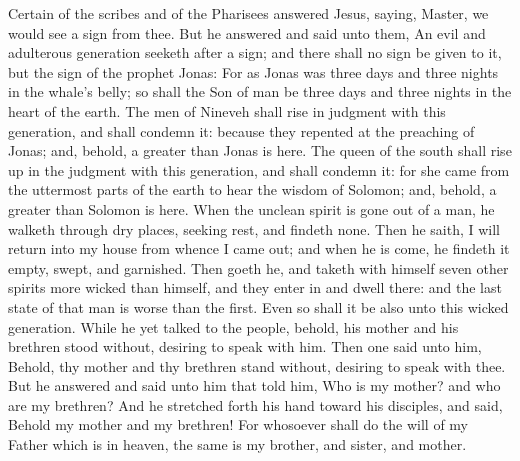 
\vspace{-0.25\baselineskip}

 Certain of the scribes and of the Pharisees answered Jesus, saying, Master, we would see a sign from thee. But he answered and said unto them, An evil and adulterous generation seeketh after a sign; and there shall no sign be given to it, but the sign of the prophet Jonas: For as Jonas was three days and three nights in the whale's belly; so shall the Son of man be three days and three nights in the heart of the earth. The men of Nineveh shall rise in judgment with this generation, and shall condemn it: because they repented at the preaching of Jonas; and, behold, a greater than Jonas is here. The queen of the south shall rise up in the judgment with this generation, and shall condemn it: for she came from the uttermost parts of the earth to hear the wisdom of Solomon; and, behold, a greater than Solomon is here. When the unclean spirit is gone out of a man, he walketh through dry places, seeking rest, and findeth none. Then he saith, I will return into my house from whence I came out; and when he is come, he findeth it empty, swept, and garnished. Then goeth he, and taketh with himself seven other spirits more wicked than himself, and they enter in and dwell there: and the last state of that man is worse than the first. Even so shall it be also unto this wicked generation. While he yet talked to the people, behold, his mother and his brethren stood without, desiring to speak with him. Then one said unto him, Behold, thy mother and thy brethren stand without, desiring to speak with thee. But he answered and said unto him that told him, Who is my mother? and who are my brethren? And he stretched forth his hand toward his disciples, and said, Behold my mother and my brethren! For whosoever shall do the will of my Father which is in heaven, the same is my brother, and sister, and mother.


